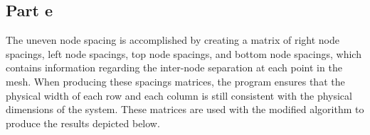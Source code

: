 \documentclass[11pt]{amsart}
\begin{document}
\subsection*{Part e}
The uneven node spacing is accomplished by creating a matrix of right node spacings, left node spacings, top node spacings, and bottom node spacings, which contains information regarding the inter-node separation at each point in the mesh. When producing these spacings matrices, the program ensures that the physical width of each row and each column is still consistent with the physical dimensions of the system. These matrices are used with the modified algorithm to produce the results depicted below.

\begin{landscape}
	
\end{landscape}
\begin{landscape}
	
\end{landscape}
\begin{landscape}
	
\end{landscape}
\begin{landscape}
	
\end{landscape}
\begin{landscape}
	
\end{landscape}
\end{document}
